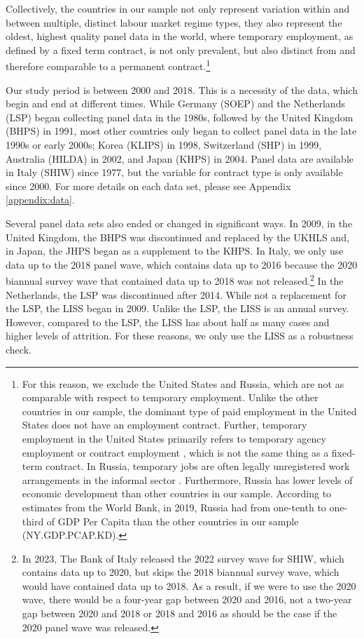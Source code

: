 \documentclass[12pt]{article}
\begin{document}
Collectively, the countries in our sample not only represent variation within and between multiple, distinct labour market regime types, they also represent the oldest, highest quality panel data in the world, where temporary employment, as defined by a fixed term contract, is not only prevalent, but also distinct from and therefore comparable to a permanent contract.\footnote{For this reason, we exclude the United States and Russia, which are not as comparable with respect to temporary employment.  Unlike the other countries in our sample, the dominant type of paid employment in the United States does not have an employment contract.  Further, temporary employment in the United States primarily refers to temporary agency employment or contract employment \citep{kalleberg_nonstandard_2000}, which is not the same thing as a fixed-term contract.  In Russia, temporary jobs are often legally unregistered work arrangements in the informal sector \citep{karabchuk_temporary_2012}. Furthermore, Russia has lower levels of economic development than other countries in our sample.  According to estimates from the World Bank, in 2019, Russia had from one-tenth to one-third of GDP Per Capita than the other countries in our sample (NY.GDP.PCAP.KD).} 

Our study period is between 2000 and 2018.  This is a necessity of the data, which begin and end at different times.  While Germany (SOEP) and the Netherlands (LSP) began collecting panel data in the 1980s, followed by the United Kingdom (BHPS) in 1991, most other countries only began to collect panel data in the late 1990s or early 2000s; Korea (KLIPS) in 1998, Switzerland (SHP) in 1999, Australia (HILDA) in 2002, and Japan (KHPS) in 2004.  Panel data are available in Italy (SHIW) since 1977, but the variable for contract type is only available since 2000.  For more details on each data set, please see Appendix \ref{appendix:data}.

Several panel data sets also ended or changed in significant ways.  In 2009, in the United Kingdom, the BHPS was discontinued and replaced by the UKHLS and, in Japan, the JHPS began as a supplement to the KHPS. In Italy, we only use data up to the 2018 panel wave, which contains data up to 2016 because the 2020 biannual survey wave that contained data up to 2018 was not released.\footnote{In 2023, The Bank of Italy released the 2022 survey wave for SHIW, which contains data up to 2020, but skips the 2018 biannual survey wave, which would have contained data up to 2018.  As a result, if we were to use the 2020 wave, there would be a four-year gap between 2020 and 2016, not a two-year gap between 2020 and 2018 or 2018 and 2016 as should be the case if the 2020 panel wave was released.}   In the Netherlands, the LSP was discontinued after 2014.  While not a replacement for the LSP, the LISS began in 2009.  Unlike the LSP, the LISS is an annual survey.  However, compared to the LSP, the LISS has about half as many cases and higher levels of attrition.  For these reasons, we only use the LISS as a robustness check.
\end{document}
